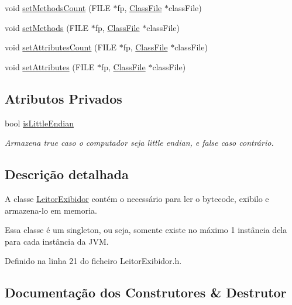 \begin{DoxyCompactItemize}
\item 
void \hyperlink{classLeitorExibidor_a6292517ec3beae1ef6ff67678110e961}{set\+Methods\+Count} (F\+I\+LE $\ast$fp, \hyperlink{classClassFile}{Class\+File} $\ast$class\+File)
\item 
void \hyperlink{classLeitorExibidor_aa7ce00ed1b02c20c2eb7ff1b503563d5}{set\+Methods} (F\+I\+LE $\ast$fp, \hyperlink{classClassFile}{Class\+File} $\ast$class\+File)
\item 
void \hyperlink{classLeitorExibidor_a891dc9f2ceb6f5c337f91a973d2ad6ee}{set\+Attributes\+Count} (F\+I\+LE $\ast$fp, \hyperlink{classClassFile}{Class\+File} $\ast$class\+File)
\item 
void \hyperlink{classLeitorExibidor_a988287e777377265b23482e307eb4a63}{set\+Attributes} (F\+I\+LE $\ast$fp, \hyperlink{classClassFile}{Class\+File} $\ast$class\+File)
\end{DoxyCompactItemize}
\subsection*{Atributos Privados}
\begin{DoxyCompactItemize}
\item 
bool \hyperlink{classLeitorExibidor_a25a267e1238c481356a970b17d2fd044}{is\+Little\+Endian}
\begin{DoxyCompactList}\small\item\em Armazena {\ttfamily true} caso o computador seja little endian, e {\ttfamily false} caso contrário. \end{DoxyCompactList}\end{DoxyCompactItemize}


\subsection{Descrição detalhada}
A classe \hyperlink{classLeitorExibidor}{Leitor\+Exibidor} contém o necessário para ler o bytecode, exibilo e armazena-\/lo em memoria. 

Essa classe é um singleton, ou seja, somente existe no máximo 1 instância dela para cada instância da J\+VM. 

Definido na linha 21 do ficheiro Leitor\+Exibidor.\+h.



\subsection{Documentação dos Construtores \& Destrutor}
\mbox{\label{classLeitorExibidor_a7785a12083b7979aa615915cb8e2d274}} 
